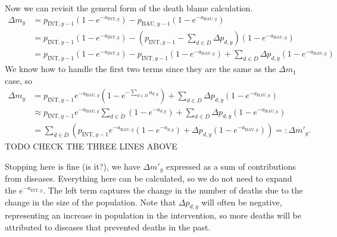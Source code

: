 \documentclass[]{article}
\begin{document}
Now we can revisit the general form of the death blame calculation.
\begin{align*}
	\Delta m_y &= p_{\text{INT}, y - 1} \left(1 - e^{-a_{\text{INT}, y}}\right) - p_{\text{BAU}, y - 1} \left(1 - e^{-a_{\text{BAU}, y}}\right) \\
	&= p_{\text{INT}, y - 1} \left(1 - e^{-a_{\text{INT}, y}}\right) - \left(p_{\text{INT}, y - 1} - \sum_{d \in D} \Delta p_{d, y} \right)  \left(1 - e^{-a_{\text{BAU}, y}}\right) \\
	&= p_{\text{INT}, y - 1} \left(1 - e^{-a_{\text{INT}, y}}\right) - p_{\text{INT}, y - 1} \left(1 - e^{-a_{\text{BAU}, y}}\right)  + \sum_{d \in D} \Delta p_{d, y} \left(1 - e^{-a_{\text{BAU}, y}}\right)
\end{align*}
We know how to handle the first two terms since they are the same as the $\Delta m_1$ case, so 
\begin{align*}
	\Delta m_y &= p_{\text{INT}, y-1} e^{-a_{\text{BAU}, y}} \left(1 - e^{-\sum_{d \in D} a_{d, y}}\right)
	 + \sum_{d \in D} \Delta p_{d, y} \left(1 - e^{-a_{\text{BAU}, y}}\right) \\
	 &\approx p_{\text{INT}, y - 1} e^{-a_{\text{BAU}, y}} \sum_{d \in D} \left(1 - e^{-a_{d, y}}\right)
	 + \sum_{d \in D} \Delta p_{d, y} \left(1 - e^{-a_{\text{BAU}, y}}\right) \\
	 &= \sum_{d \in D} \left(p_{\text{INT}, y - 1} e^{-a_{\text{BAU}, y}} \left(1 - e^{-a_{d, y}}\right)
	 + \Delta p_{d, y} \left(1 - e^{-a_{\text{BAU}, y}}\right) \right) =: \Delta m'_y.
\end{align*}
TODO CHECK THE THREE LINES ABOVE

Stopping here is fine (is it?), we have $\Delta m'_y$ expressed as a sum of contributions from diseases. Everything here can be calculated, so we do not need to expand the $e^{-a_{\text{INT}, y}}$. The left term captures the change in the number of deaths due to the change in the size of the population. Note that $\Delta p_{d, y}$ will often be negative, representing an increase in population in the intervention, so more deaths will be attributed to diseases that prevented deaths in the past.
\end{document}
